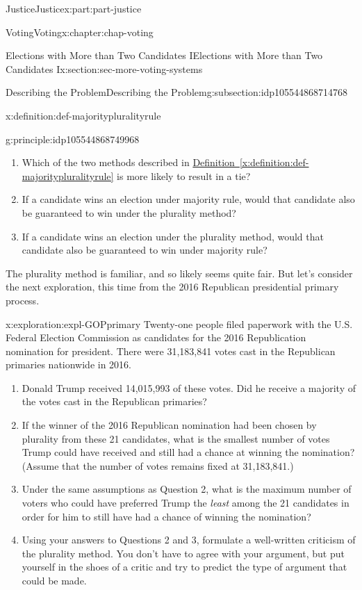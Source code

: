 \documentclass[oneside,10pt,]{book}
\newcommand{\xreffont}{\relax}
\numberwithin{equation}{section}
\begin{document}
\begin{partptx}{Justice}{}{Justice}{}{}{x:part:part-justice}
\begin{chapterptx}{Voting}{}{Voting}{}{}{x:chapter:chap-voting}
\begin{sectionptx}{Elections with More than Two Candidates I}{}{Elections with More than Two Candidates I}{}{}{x:section:sec-more-voting-systems}
\begin{subsectionptx}{Describing the Problem}{}{Describing the Problem}{}{}{g:subsection:idp105544868714768}
\begin{definition}{}{x:definition:def-majoritypluralityrule}
\end{definition}
\begin{principle}{}{}{g:principle:idp105544868749968}%
%
\begin{enumerate}
\item{}Which of the two methods described in \hyperref[x:definition:def-majoritypluralityrule]{Definition~{\xreffont\ref{x:definition:def-majoritypluralityrule}}} is more likely to result in a tie?%
\item{}If a candidate wins an election under majority rule, would that candidate also be guaranteed to win under the plurality method?%
\item{}If a candidate wins an election under the plurality method, would that candidate also be guaranteed to win under majority rule?%
\end{enumerate}
\end{principle}
The plurality method is familiar, and so likely seems quite fair. But let's consider the next exploration, this time from the 2016 Republican presidential primary process.%
\begin{exploration}{}{x:exploration:expl-GOPprimary}%
Twenty-one people filed paperwork with the U.S. Federal Election Commission as candidates for the 2016 Republication nomination for president. There were 31,183,841 votes cast in the Republican primaries nationwide in 2016.%
%
\begin{enumerate}
\item{}Donald Trump received 14,015,993 of these votes. Did he receive a majority of the votes cast in the Republican primaries?%
\item{}If the winner of the 2016 Republican nomination had been chosen by plurality from these 21 candidates, what is the smallest number of votes Trump could have received and still had a chance at winning the nomination? (Assume that the number of votes remains fixed at 31,183,841.)%
\item{}Under the same assumptions as Question 2, what is the maximum number of voters who could have preferred Trump the \emph{least} among the 21 candidates in order for him to still have had a chance of winning the nomination?%
\item{}Using your answers to Questions 2 and 3, formulate a well-written criticism of the plurality method. You don't have to agree with your argument, but put yourself in the shoes of a critic and try to predict the type of argument that could be made.%
\end{enumerate}
\end{exploration}%

\end{subsectionptx}
\end{sectionptx}
\end{chapterptx}
\end{partptx}
\end{document}
